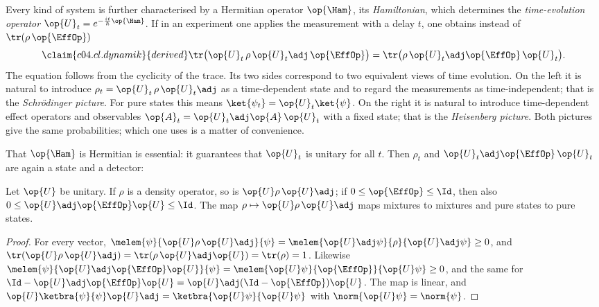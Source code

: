 Every kind of system is further characterised by a Hermitian operator $\op{\Ham}$, its
\emph{Hamiltonian}, which determines the \emph{time-evolution operator}
$\op{U}_t = e^{-\frac{it}{\hbar}\op{\Ham}}$. If in an experiment one applies the measurement with a
delay $t$, one obtains instead of $\tr(\rho\,\op{\EffOp})$
\begin{equation}\label{c04.eq.dynamik}\claim{c04.cl.dynamik}{derived}
  \tr\bigl(\op{U}_t\, \rho\, \op{U}_t\adj\, \op{\EffOp}\bigr) = \tr\bigl(\rho\, \op{U}_t\adj \op{\EffOp}\, \op{U}_t\bigr) .
\end{equation}
The equation follows from the cyclicity of the trace. Its two sides correspond to two equivalent
views of time evolution. On the left it is natural to introduce
$\rho_t = \op{U}_t\, \rho\, \op{U}_t\adj$ as a time-dependent state and to regard the
measurements as time-independent; that is the \emph{Schrödinger picture}. For pure states this
means $\ket{\psi_t} = \op{U}_t\ket{\psi}$. On the right it is natural to introduce time-dependent
effect operators and observables $\op{A}_t = \op{U}_t\adj \op{A}\, \op{U}_t$ with a fixed state;
that is the \emph{Heisenberg picture}. Both pictures give the same probabilities; which one uses is
a matter of convenience.

That $\op{\Ham}$ is Hermitian is essential: it guarantees that $\op{U}_t$ is
unitary for all $t$. Then $\rho_t$ and $\op{U}_t\adj\op{\EffOp}\,\op{U}_t$ are again a state and
a detector:

\begin{proposition}\label{c04.prop.dynamik}
  Let $\op{U}$ be unitary. If $\rho$ is a density operator, so is $\op{U}\rho\,\op{U}\adj$; if
  $0 \leq \op{\EffOp} \leq \Id$, then also $0 \leq \op{U}\adj\op{\EffOp}\op{U} \leq \Id$. The map
  $\rho \mapsto \op{U}\rho\,\op{U}\adj$ maps mixtures to mixtures and pure states to pure states.
\end{proposition}
\begin{proof}
  For every vector,
  $\melem{\psi}{\op{U}\rho\,\op{U}\adj}{\psi} = \melem{\op{U}\adj\psi}{\rho}{\op{U}\adj\psi} \geq 0$,
  and $\tr(\op{U}\rho\,\op{U}\adj) = \tr(\rho\,\op{U}\adj\op{U}) = \tr(\rho) = 1$. Likewise
  $\melem{\psi}{\op{U}\adj\op{\EffOp}\op{U}}{\psi} = \melem{\op{U}\psi}{\op{\EffOp}}{\op{U}\psi} \geq 0$,
  and the same for $\Id - \op{U}\adj\op{\EffOp}\op{U} = \op{U}\adj(\Id - \op{\EffOp})\op{U}$. The
  map is linear, and $\op{U}\ketbra{\psi}{\psi}\op{U}\adj = \ketbra{\op{U}\psi}{\op{U}\psi}$
  with $\norm{\op{U}\psi} = \norm{\psi}$.
\end{proof}

